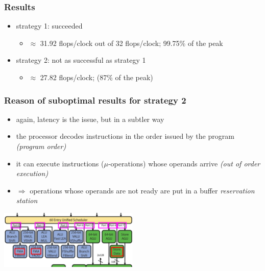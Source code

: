 \documentclass[12pt,dvipdfmx]{beamer}
\newcommand{\ao}[1]{{\color{blue}#1}}
\begin{document}
\iffalse
\begin{frame}
\frametitle{Results}
\begin{itemize}
\item strategy 1: succeeded 
  \begin{itemize}
  \item $\approx$ 31.92 flops/clock out of 32 flops/clock; 99.75\% of the peak
  \end{itemize}
\item strategy 2: 
  not as successful as strategy 1 
  \begin{itemize}
  \item $\approx$ 27.82 flops/clock; (87\% of the peak)
  \end{itemize}


\end{itemize}
\end{frame}
\begin{frame}
\frametitle{Reason of suboptimal results for strategy 2}
\begin{itemize}
\item<1-> again, latency is the issue, but in a subtler way

\item<2-> the processor decodes instructions in the order issued by the program
  \ao{\emph{(program order)}}

\item<3-> it can execute instructions ($\mu$-operations) 
  whose operands arrive \ao{\emph{(out of order execution)}}

\item<4-> $\Rightarrow$ operations whose operands are not ready are put 
  in a buffer \ao{\emph{reservation station}}
\end{itemize}

\begin{center}
\includegraphics[width=0.5\textwidth]{out/pdf/svg/haswell_ports.pdf}
\end{center}
\end{frame}
\end{document}
